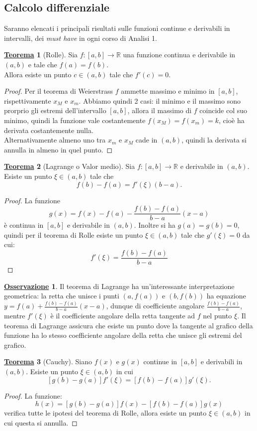 \documentclass[a4paper,twoside]{article}
\newcommand{\R}{\mathbb{R}}
\theoremstyle{definition}
\newtheorem{theorem}{\color{Red}\underline{\textrm Teorema}}
\newtheorem{oss}{\underline{\textrm Osservazione}}
\numberwithin{theorem}{section}
\begin{document}
\subsection{Calcolo differenziale}
Saranno elencati i principali risultati sulle funzioni continue e derivabili in intervalli, dei \emph{must have} in ogni corso di Analisi 1.
\begin{theorem}[Rolle]
Sia $f:[a,b]\to\R$ una funzione continua e derivabile in $(a,b)$ e tale che $f(a)=f(b)$.\\ Allora esiste un punto $c\in(a,b)$ tale che $f'(c)=0$.   
\end{theorem}
\begin{proof}
    Per il teorema di Weierstrass $f$ ammette massimo e minimo in $[a,b]$, rispettivamente $x_M$ e $x_m$. Abbiamo quindi 2 casi:
    il minimo e il massimo sono prorprio gli estremi dell'intervallo $[a,b]$, allora il massimo di $f$ coincide col suo minimo, quindi la funzione vale costantemente $f(x_M)=f(x_m)=k$, cioè ha derivata costantemente nulla. \\
    Alternativamente almeno uno tra $x_m$ e $x_M$ cade in $(a,b)$, quindi la derivata si annulla in almeno in quel punto.
\end{proof}
\begin{theorem}[Lagrange o Valor medio]
Sia $f:[a,b]\to\R$ e derivabile in $(a,b)$. Esiste un punto $\xi\in(a,b)$ tale che $$f(b)-f(a)=f'(\xi)(b-a).$$
\end{theorem}
\begin{proof}
    La funzione $$g(x)=f(x)-f(a)-\frac{f(b)-f(a)}{b-a}(x-a)$$ è continua in $[a,b]$ e derivabile in $(a,b)$. Inoltre si ha $g(a)=g(b)=0$, quindi per il teorema di Rolle esiste un punto $\xi\in(a,b)$ tale che $g'(\xi)=0$ da cui: $$f'(\xi)=\frac{f(b)-f(a)}{b-a}$$
\end{proof}
\begin{oss}
    Il teorema di Lagrange ha un'interessante interpretazione geometrica: la retta che unisce i punti $(a,f(a))$ e $(b,f(b))$ ha equazione $y=f(a)+\frac{f(b)-f(a)}{b-a}(x-a)$, dunque di coefficiente angolare $\frac{f(b)-f(a)}{b-a}$, mentre $f'(\xi)$ è il coefficiente angolare della retta tangente ad $f$ nel punto $\xi$. Il teorema di Lagrange assicura che esiste un punto dove la tangente al grafico della funzione ha lo stesso coefficiente angolare della retta che unisce gli estremi del grafico.
\end{oss}
\begin{theorem}[Cauchy]
    Siano $f(x)$ e $g(x)$ continue in $[a,b]$ e derivabili in $(a,b)$. Esiste un punto $\xi\in(a,b)$ in cui
    $$[g(b)-g(a)]f'(\xi)=[f(b)-f(a)]g'(\xi).$$
\end{theorem}
\begin{proof}
    La funzione: $$h(x)=[g(b)-g(a)]f(x)-[f(b)-f(a)]g(x)$$ verifica tutte le ipotesi del teorema di Rolle, allora esiste un punto $\xi\in(a,b)$ in cui questa si annulla. 
\end{proof}
\end{document}
